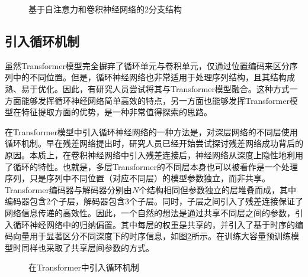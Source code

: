 \begin{figure}[htp]
\centering

\caption{基于自注意力和卷积神经网络的2分支结构}
\label{fig:15-7}
\end{figure}


\subsection{引入循环机制}

\parinterval 虽然Transformer模型完全摒弃了循环单元与卷积单元，仅通过位置编码来区分序列中的不同位置。但是，循环神经网络也非常适用于处理序列结构，且其结构成熟、易于优化。因此，有研究人员尝试将其与Transformer模型融合。这种方式一方面能够发挥循环神经网络简单高效的特点，另一方面也能够发挥Transformer模型在特征提取方面的优势，是一种非常值得探索的思路。

\parinterval 在Transformer模型中引入循环神经网络的一种方法是，对深层网络的不同层使用循环机制。早在残差网络提出时，研究人员已经开始尝试探讨残差网络成功背后的原因。本质上，在卷积神经网络中引入残差连接后，神经网络从深度上隐性地利用了循环的特性。也就是，多层Transformer的不同层本身也可以被看作是一个处理序列，只是序列中不同位置（对应不同层）的模型参数独立，而非共享。Transformer编码器与解码器分别由$N$个结构相同但参数独立的层堆叠而成，其中编码器包含2个子层，解码器包含3个子层。同时，子层之间引入了残差连接保证了网络信息传递的高效性。因此，一个自然的想法是通过共享不同层之间的参数，引入循环神经网络中的归纳偏置。其中每层的权重是共享的，并引入了基于时序的编码向量用于显著区分不同深度下的时序信息，如图\ref{fig:15-8}所示。在训练大容量预训练模型时同样也采取了共享层间参数的方式。

\begin{figure}[htp]
\centering

\caption{在Transformer中引入循环机制}
\label{fig:15-8}
\end{figure}

